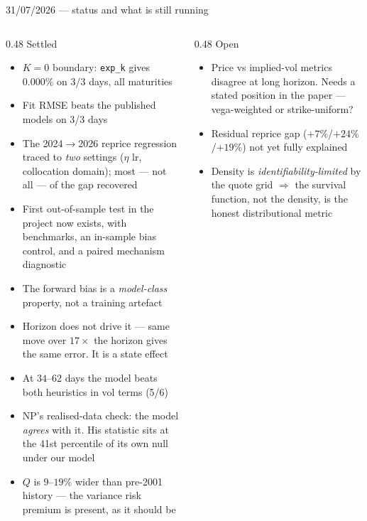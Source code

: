 \documentclass[aspectratio=169,11pt]{beamer}
\newcommand{\gold}[1]{{\color{ntugold}#1}}
\newcommand{\red}[1]{{\color{ntured}#1}}
\begin{document}
\begin{frame}[shrink=14]{31/07/2026 --- status and what is still running}
  \begin{columns}[T]
    \begin{column}{0.48\linewidth}
      \gold{Settled}
      \begin{itemize}\scriptsize
        \item $K{=}0$ boundary: \texttt{exp\_k} gives $0.000\%$ on 3/3 days, all maturities
        \item Fit RMSE beats the published models on 3/3 days
        \item The 2024$\to$2026 reprice regression traced to \emph{two} settings
              ($\eta$ lr, collocation domain); most --- not all --- of the gap recovered
        \item First out-of-sample test in the project now exists, with benchmarks, an
              in-sample bias control, and a paired mechanism diagnostic
        \item The forward bias is a \emph{model-class} property, not a training artefact
        \item \red{Horizon does not drive it} --- same move over $17\times$ the horizon
              gives the same error. It is a state effect
        \item \red{At $34$--$62$ days the model beats both heuristics in vol terms} (5/6)
        \item \red{NP's realised-data check: the model \emph{agrees} with it.} His statistic
              sits at the 41st percentile of its own null under our model
        \item $Q$ is $9$--$19\%$ wider than pre-2001 history --- the variance risk premium
              is present, as it should be
      \end{itemize}
    \end{column}
    \begin{column}{0.48\linewidth}
      \gold{Open}
      \begin{itemize}\scriptsize
        \item \gold{Price vs implied-vol metrics disagree} at long horizon. Needs a stated
              position in the paper --- vega-weighted or strike-uniform?
        \item Residual reprice gap ($+7\%$/$+24\%$/$+19\%$) not yet fully explained
        \item Density is \emph{identifiability-limited} by the quote grid $\Rightarrow$ the
              survival function, not the density, is the honest distributional metric

\end{itemize}
\end{column}
\end{columns}
\end{frame}
\end{document}
